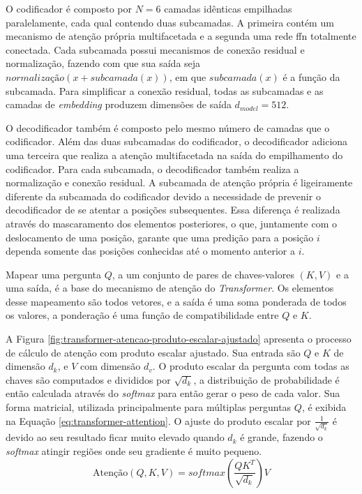 O codificador é composto por $N = 6$ camadas idênticas empilhadas paralelamente, cada qual contendo duas subcamadas. A primeira contém um mecanismo de atenção própria multifacetada e a segunda uma rede \gls{ffn} totalmente conectada. Cada subcamada possui mecanismos de conexão residual e normalização, fazendo com que sua saída seja $\textit{normalização}(x + \textit{subcamada}(x))$, em que $\textit{subcamada}(x)$ é a função da subcamada. Para simplificar a conexão residual, todas as subcamadas e as camadas de \textit{embedding} produzem dimensões de saída $d_{model} = 512$.

O decodificador também é composto pelo mesmo número de camadas que o codificador. Além das duas subcamadas do codificador, o decodificador adiciona uma terceira que realiza a atenção multifacetada na saída do empilhamento do codificador. Para cada subcamada, o decodificador também realiza a normalização e conexão residual. A subcamada de atenção própria é ligeiramente diferente da subcamada do codificador devido a necessidade de prevenir o decodificador de se atentar a posições subsequentes. Essa diferença é realizada através do mascaramento dos elementos posteriores, o que, juntamente com o deslocamento de uma posição, garante que uma predição para a posição $i$ dependa somente das posições conhecidas até o momento anterior a $i$.

Mapear uma pergunta $Q$, a um conjunto de pares de chaves-valores $(K, V)$ e a uma saída, é a base do mecanismo de atenção do \textit{Transformer}. Os elementos desse mapeamento são todos vetores, e a saída é uma soma ponderada de todos os valores, a ponderação é uma função de compatibilidade entre $Q$ e $K$.

A Figura \ref{fig:transformer-atencao-produto-escalar-ajustado} apresenta o processo de cálculo de atenção com produto escalar ajustado. Sua entrada são $Q$ e $K$ de dimensão $d_k$, e $V$ com dimensão $d_v$. O produto escalar da pergunta com todas as chaves são computados e divididos por $\sqrt{d_k}$, a distribuição de probabilidade é então calculada através do \textit{softmax} para então gerar o peso de cada valor. Sua forma matricial, utilizada principalmente para múltiplas perguntas $Q$, é exibida na Equação \ref{eq:transformer-attention}. O ajuste do produto escalar por $\frac{1}{\sqrt{d_k}}$ é devido ao seu resultado ficar muito elevado quando $d_k$ é grande, fazendo o \textit{softmax} atingir regiões onde seu gradiente é muito pequeno.
\begin{equation}
    \label{eq:transformer-attention}
    \text{Atenção}(Q, K, V) = softmax \left( \frac{QK^T}{\sqrt{d_k}} \right) V
\end{equation}

